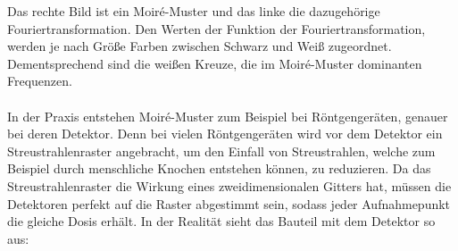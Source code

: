 \documentclass[a4paper,12pt]{article}
\theoremstyle{definition}
\theoremstyle{remark}
\begin{document}
Das rechte Bild ist ein Moiré-Muster und das linke die dazugehörige Fouriertransformation. Den Werten der Funktion der Fouriertransformation, werden 
je nach Größe Farben zwischen Schwarz und Weiß zugeordnet. Dementsprechend sind die weißen Kreuze, die im Moiré-Muster dominanten Frequenzen. 
\\\\
In der Praxis entstehen Moiré-Muster zum Beispiel bei Röntgengeräten, genauer bei deren Detektor. Denn bei vielen Röntgengeräten wird vor dem Detektor 
ein Streustrahlenraster angebracht, um den Einfall von Streustrahlen, welche zum Beispiel durch menschliche Knochen entstehen können, zu reduzieren. 
Da das Streustrahlenraster die Wirkung eines zweidimensionalen Gitters hat, müssen die Detektoren perfekt auf die Raster abgestimmt sein, sodass jeder 
Aufnahmepunkt die gleiche Dosis erhält. In der Realität sieht das Bauteil mit dem Detektor so aus:
\end{document}
